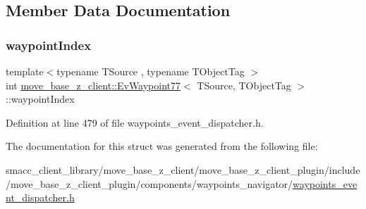 \subsection{Member Data Documentation}
\mbox{\label{structmove__base__z__client_1_1EvWaypoint77_ac09c33a938a9a15ecc42c4b191b036fb}} 
\subsubsection{\texorpdfstring{waypoint\+Index}{waypointIndex}}
{\footnotesize\ttfamily template$<$typename T\+Source , typename T\+Object\+Tag $>$ \\
int \hyperlink{structmove__base__z__client_1_1EvWaypoint77}{move\+\_\+base\+\_\+z\+\_\+client\+::\+Ev\+Waypoint77}$<$ T\+Source, T\+Object\+Tag $>$\+::waypoint\+Index}



Definition at line 479 of file waypoints\+\_\+event\+\_\+dispatcher.\+h.



The documentation for this struct was generated from the following file\+:\begin{DoxyCompactItemize}
\item 
smacc\+\_\+client\+\_\+library/move\+\_\+base\+\_\+z\+\_\+client/move\+\_\+base\+\_\+z\+\_\+client\+\_\+plugin/include/move\+\_\+base\+\_\+z\+\_\+client\+\_\+plugin/components/waypoints\+\_\+navigator/\hyperlink{waypoints__event__dispatcher_8h}{waypoints\+\_\+event\+\_\+dispatcher.\+h}\end{DoxyCompactItemize}
